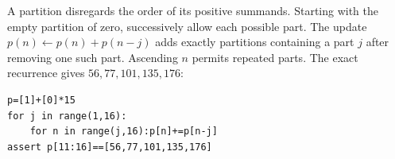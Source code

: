 A partition disregards the order of its positive summands. Starting with the empty partition of zero, successively allow each possible part. The update $ p(n)\gets p(n)+p(n-j)$ adds exactly partitions containing a part $ j $ after removing one such part. Ascending $ n $ permits repeated parts. The exact recurrence gives $\boxed{56,77,101,135,176}$:
\begin{verbatim}
p=[1]+[0]*15
for j in range(1,16):
    for n in range(j,16):p[n]+=p[n-j]
assert p[11:16]==[56,77,101,135,176]
\end{verbatim}
